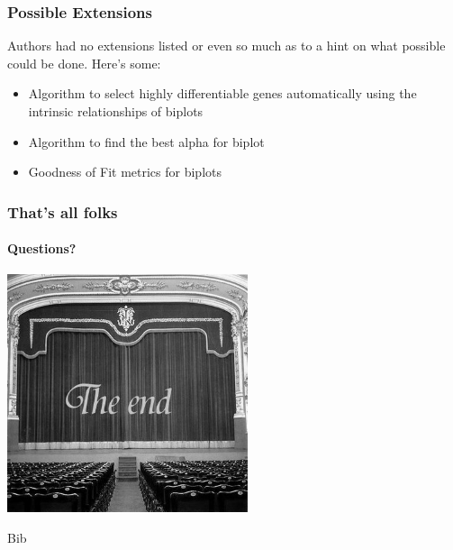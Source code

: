 \documentclass[serif]{beamer}
\begin{document}
	\begin{frame}[t]
		\frametitle{Possible Extensions}
		Authors had no extensions listed or even so much as to a hint on what possible could be done.
		\newline\newline
		Here's some:
		\begin{itemize}
			\item  Algorithm to select highly differentiable genes automatically
			using the intrinsic relationships of biplots
			\item  Algorithm to find the best alpha for biplot
			\item  Goodness of Fit metrics for biplots
		\end{itemize}
	\end{frame}
	
	\begin{frame}
		\frametitle{That's all folks}
		\framesubtitle{Questions?}
		
		\begin{center}
			\includegraphics[height=2.75in]{images/end}	
		\end{center}
		
	\end{frame}

	\begin{frame}
		Bib
	\end{frame}
	
\end{document}
